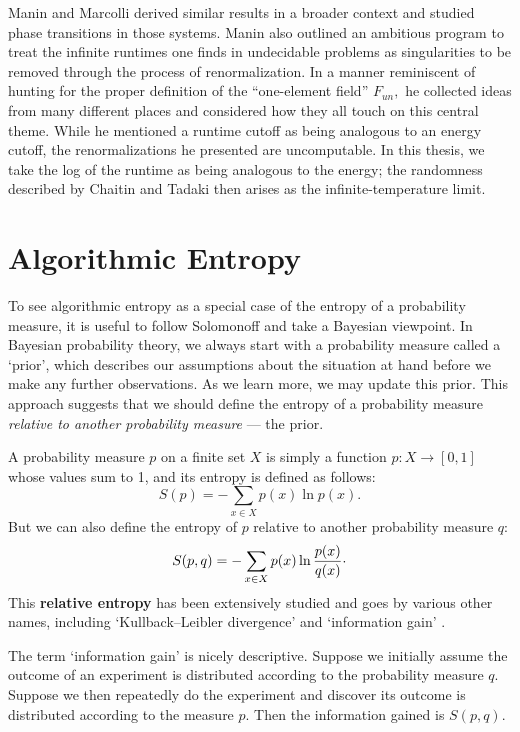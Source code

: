 \documentclass[12pt,twoside,openright]{report}
\newcommand{\maps}{\colon}
\begin{document}
Manin and Marcolli \cite{MM2009} derived similar results in a broader context and studied phase transitions in those systems.  Manin \cite{ManinRenorm1, ManinRenorm2}
also outlined an ambitious program to treat the infinite runtimes one finds in undecidable problems as singularities to be removed through the process of renormalization.  In a manner reminiscent of hunting for the proper definition of the 
``one-element field'' $F_{un},$ he collected ideas from many different places and considered how they all touch on this central theme. While he mentioned a runtime cutoff as being analogous to an energy cutoff, the renormalizations he presented are uncomputable.  In this thesis, we take the log of the runtime as being analogous to the energy; the randomness described by Chaitin and Tadaki then arises as the infinite-temperature limit.

\section{Algorithmic Entropy}\label{entropy}

To see algorithmic entropy as a special case of the entropy of a probability measure, it is useful to follow Solomonoff
\cite{Solomonoff1964} and take a Bayesian viewpoint.  In Bayesian probability theory, we always start with a probability measure called a `prior', which describes our assumptions about the situation at hand before we make any further observations. As we learn more, we may update this prior.  This approach suggests that we should define the entropy of a probability measure
\textit{relative to another probability measure} --- the prior.

A probability measure $p$ on a finite set $X$ is simply a function $p
\maps X \to [0,1]$ whose values sum to 1, and its entropy is defined as follows:
\[  S(p) = -\sum_{x \in X} p(x) \ln p(x)  .\]
But we can also define the entropy of $p$ relative to another probability measure $q$:
\[  S(p,q) = -\sum_{x \in X} p(x) \ln\frac{p(x)}{q(x)} \raisebox{0.4ex}{.}\]
This {\bf relative entropy} has been extensively studied and goes by various other names, including `Kullback--Leibler divergence' \cite{KL}
and `information gain' \cite{Renyi}.  

The term `information gain' is nicely descriptive.  Suppose we initially assume the outcome of an experiment is distributed according to the probability measure $q$.  Suppose we then repeatedly do the experiment and discover its outcome is distributed according to the measure $p$. Then the information gained is $S(p,q)$.
\end{document}
